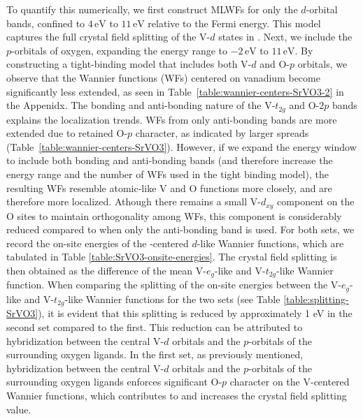 \documentclass[%
 reprint,
 amsmath,amssymb,
 aps,
]{revtex4-2}
\begin{document}
To quantify this numerically, we first construct MLWFs for only the \(d\)-orbital bands, confined to \(4 \, \text{eV}\) to \(11 \, \text{eV}\) relative to the Fermi energy. This model captures the full crystal field splitting of the V-\(d\) states in . Next, we include the \(p\)-orbitals of oxygen, expanding the energy range to \(-2 \, \text{eV}\) to \(11 \, \text{eV}\). 
By constructing a tight-binding model that includes both V-\(d\) and O-\(p\) orbitals, we observe that the Wannier functions (WFs) centered on vanadium become significantly less extended, as seen in Table~\ref{table:wannier-centers-SrVO3-2} in the Appenidx. The bonding and anti-bonding nature of the V-\(t_{2g}\) and O-\(2p\) bands explains the localization trends. WFs from only anti-bonding bands are more extended due to retained O-\(p\) character, as indicated by larger spreads (Table~\ref{table:wannier-centers-SrVO3}). However, if we expand the energy window to include both bonding and anti-bonding bands (and therefore increase the energy range and the number of WFs used in the tight binding model), the resulting WFs resemble atomic-like V and O functions more closely, and are therefore more localized. Athough there remains a small V-\(d_{xy}\) component on the O sites to maintain orthogonality among WFs, this component is considerably reduced compared to when only the anti-bonding band is used.
For both sets, we record the on-site energies of the -centered \(d\)-like Wannier functions, which are tabulated in Table \ref{table:SrVO3-onsite-energies}. The crystal field splitting is then obtained as the difference of the mean V-\(e_g\)-like and V-\(t_{2g}\)-like Wannier function. 
When comparing the splitting of the on-site energies between the V-\(e_g\)-like and V-\(t_{2g}\)-like Wannier functions for the two sets (see Table \ref{table:splitting-SrVO3}), it is evident that this splitting is reduced by approximately 1 eV in the second set compared to the first. This reduction can be attributed to hybridization between the central V-\(d\) orbitals and the \(p\)-orbitals of the surrounding oxygen ligands. In the first set, as previously mentioned, hybridization between the central V-\(d\) orbitals and the \(p\)-orbitals of the surrounding oxygen ligands enforces significant O-\(p\) character on the V-centered Wannier functions, which contributes to and increases the crystal field splitting value.
\end{document}
